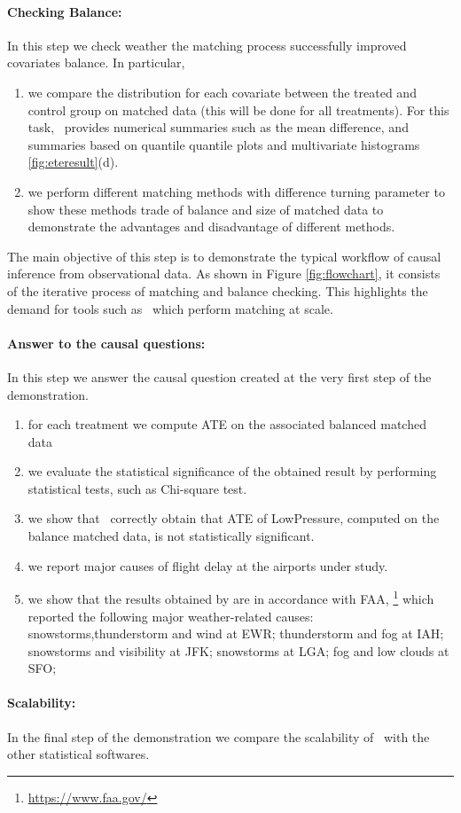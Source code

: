 \paragraph{\bf Checking Balance:}  In this step we check weather the matching process  successfully improved covariates balance. In particular,
    \begin{enumerate}
      \item  we compare the distribution for each covariate between the treated and control group on matched data (this will be done for all treatments). For this task, \GSQL\  provides numerical summaries such as the mean difference, and summaries based on quantile quantile plots and multivariate histograms \ref{fig:eteresult}(d).

      \item  we perform different matching methods with difference turning parameter to show these methods trade of balance and size of matched data to demonstrate the advantages and disadvantage of different methods.
       \end{enumerate}
      The main objective of this step is to demonstrate the typical workflow of causal inference from observational data. As shown in Figure \ref{fig:flowchart}, it consists of the iterative process of matching and balance checking. This highlights the demand for tools such as \GSQL\, which perform matching at scale.

     \paragraph{\bf Answer to the causal questions:} In this step  we answer the causal question created at the very first step of the demonstration. 
       \begin{enumerate}
       \item for each treatment we compute ATE on the associated balanced matched data
      \item we evaluate the statistical significance of the obtained result by performing statistical tests, such as Chi-square test.
    \item we show that \GSQL\ correctly obtain that ATE of LowPressure, computed on the balance matched data, is not statistically significant.
        \item we report major causes of flight delay at the airports under study.
    \item   we show that the results obtained by \GSQL are in accordance with 
FAA, \footnote{\url{https://www.faa.gov/}} which reported the following major weather-related
causes:
snowstorms,thunderstorm and wind at EWR; thunderstorm and fog at IAH;
snowstorms and visibility at JFK; snowstorms at LGA; fog and low
clouds at SFO;
 
        \end{enumerate}



\paragraph{\bf Scalability:} In the final step of the demonstration we compare the scalability
of \GSQL\ with the other statistical softwares.  


